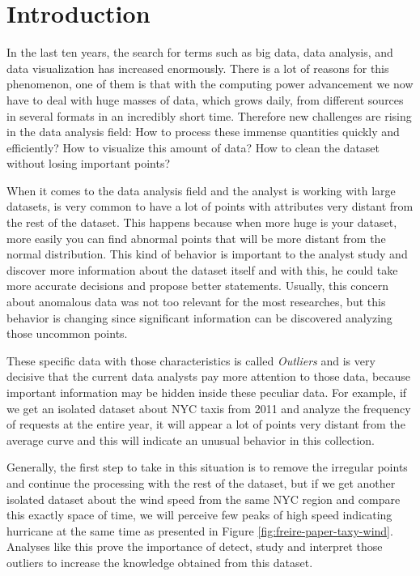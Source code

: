 \chapter{Introduction}



In the last ten years, the search for terms such as big data, data analysis, and data visualization has increased enormously. There is a lot of reasons for this phenomenon, one of them is that with the computing power advancement we now have to deal with huge masses of data, which grows daily, from different sources in several formats in an incredibly short time. Therefore new challenges are rising in the data analysis field: How to process these immense quantities quickly and efficiently? How to visualize this amount of data? How to clean the dataset without losing important points?

When it comes to the data analysis field and the analyst is working with large datasets, is very common to have a lot of points with attributes very distant from the rest of the dataset. This happens because when more huge is your dataset, more easily you can find abnormal points that will be more distant from the normal distribution. This kind of behavior is important to the analyst study and discover more information about the dataset itself and with this, he could take more accurate decisions and propose better statements. Usually, this concern about anomalous data was not too relevant for the most researches, but this behavior is changing since significant information can be discovered analyzing those uncommon points.

These specific data with those characteristics is called \textit{Outliers} and is very decisive that the current data analysts pay more attention to those data, because important information may be hidden inside these peculiar data. For example, if we get an isolated dataset about NYC taxis from 2011 and analyze the frequency of requests at the entire year, it will appear a lot of points very distant from the average curve and this will indicate an unusual behavior in this collection.

Generally, the first step to take in this situation is to remove the irregular points and continue the processing with the rest of the dataset, but if we get another isolated dataset about the wind speed from the same NYC region and compare this exactly space of time, we will perceive few peaks of high speed indicating hurricane at the same time \cite{DBLP:journals/debu/FreireCVZ16} as presented in Figure \ref{fig:freire-paper-taxy-wind}. Analyses like this prove the importance of detect, study and interpret those outliers to increase the knowledge obtained from this dataset.

